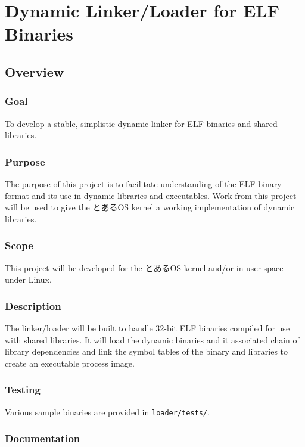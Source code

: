 \section{Dynamic Linker/Loader for ELF Binaries}
\subsection{Overview}

\subsubsection{Goal}

To develop a stable, simplistic dynamic linker for ELF binaries and
shared libraries.

\subsubsection{Purpose}

The purpose of this project is to facilitate understanding of the ELF
binary format and its use in dynamic libraries and executables. Work
from this project will be used to give the とあるOS kernel a working
implementation of dynamic libraries.

\subsubsection{Scope}

This project will be developed for the とあるOS kernel and/or in
user-space under Linux.

\subsubsection{Description}

The linker/loader will be built to handle 32-bit ELF binaries
compiled for use with shared libraries. It will load the dynamic
binaries and it associated chain of library dependencies and link
the symbol tables of the binary and libraries to create an
executable process image.

\subsubsection{Testing}

Various sample binaries are provided in \texttt{loader/tests/}.

\subsubsection{Documentation}

